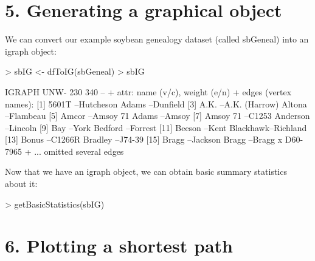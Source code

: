\documentclass{article}
\begin{document}
\section*{5. Generating a graphical object}

We can convert our example soybean genealogy dataset (called sbGeneal) into an igraph object:

\begin{Schunk}
\begin{Sinput}
> sbIG <- dfToIG(sbGeneal)
> sbIG
\end{Sinput}
\begin{Soutput}
IGRAPH UNW- 230 340 -- 
+ attr: name (v/c), weight (e/n)
+ edges (vertex names):
 [1] 5601T    --Hutcheson        Adams    --Dunfield        
 [3] A.K.     --A.K. (Harrow)    Altona   --Flambeau        
 [5] Amcor    --Amsoy 71         Adams    --Amsoy           
 [7] Amsoy 71 --C1253            Anderson --Lincoln         
 [9] Bay      --York             Bedford  --Forrest         
[11] Beeson   --Kent             Blackhawk--Richland        
[13] Bonus    --C1266R           Bradley  --J74-39          
[15] Bragg    --Jackson          Bragg    --Bragg x D60-7965
+ ... omitted several edges
\end{Soutput}
\end{Schunk}

Now that we have an igraph object, we can obtain basic summary statistics about it:

\begin{Schunk}
\begin{Sinput}
> getBasicStatistics(sbIG)
\end{Sinput}
\end{Schunk}

\section*{6. Plotting a shortest path}
\end{document}
